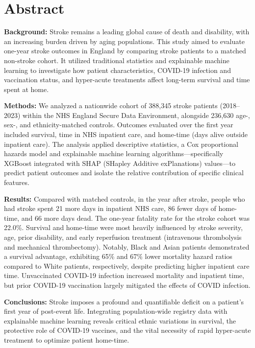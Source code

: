 \section*{Abstract}

\textbf{Background:} Stroke remains a leading global cause of death and disability, with an increasing burden driven by aging populations. This study aimed to evaluate one-year stroke outcomes in England by comparing stroke patients to a matched non-stroke cohort. It utilized traditional statistics and explainable machine learning to investigate how patient characteristics, COVID-19 infection and vaccination status, and hyper-acute treatments affect long-term survival and time spent at home.

\textbf{Methods:} We analyzed a nationwide cohort of 388,345 stroke patients (2018–2023) within the NHS England Secure Data Environment, alongside 236,630 age-, sex-, and ethnicity-matched controls. Outcomes evaluated over the first year included survival, time in NHS inpatient care, and home-time (days alive outside inpatient care). The analysis applied descriptive statistics, a Cox proportional hazards model and explainable machine learning algorithms—specifically XGBoost integrated with SHAP (SHapley Additive exPlanations) values—to predict patient outcomes and isolate the relative contribution of specific clinical features.

\textbf{Results:} Compared with matched controls, in the year after stroke, people who had stroke spent 21 more days in inpatient NHS care, 86 fewer days of home-time, and 66 more days dead. The one-year fatality rate for the stroke cohort was 22.0\%. Survival and home-time were most heavily influenced by stroke severity, age, prior disability, and early reperfusion treatment (intravenous thrombolysis and mechanical thrombectomy). Notably, Black and Asian patients demonstrated a survival advantage, exhibiting 65\% and 67\% lower mortality hazard ratios compared to White patients, respectively, despite predicting higher inpatient care time. Unvaccinated COVID-19 infection increased mortality and inpatient time, but prior COVID-19 vaccination largely mitigated the effects of COVID infection.

\textbf{Conclusions:} Stroke imposes a profound and quantifiable deficit on a patient's first year of post-event life. Integrating population-wide registry data with explainable machine learning reveals critical ethnic variations in survival, the protective role of COVID-19 vaccines, and the vital necessity of rapid hyper-acute treatment to optimize patient home-time.
